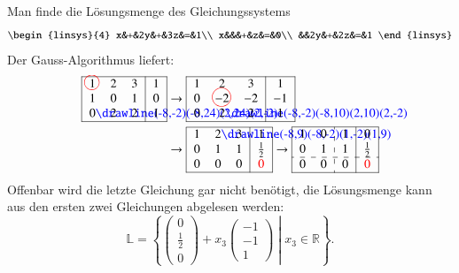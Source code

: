 \begin{beispiel}
Man finde die Lösungsmenge des Gleichungssystems
\[
\begin{linsys}{4}
x&+&2y&+&3z&=&1\\
x&&&+&z&=&0\\
 &&2y&+&2z&=&1
\end{linsys}
\]
Der Gauss-Algorithmus liefert:
\begin{align*}
\begin{tabular}{|>{$}c<{$}>{$}c<{$}>{$}c<{$}|>{$}c<{$}|}
\hline
1%
\begin{picture}(0,0)
\color{red}\put(-3,4){\circle{12}}
\end{picture}%
&2&3&1\\
1&0&1&0\\
0%
\begin{picture}(0,0)
\color{blue}\drawline(-8,-2)(-8,24)(2,24)(2,-2)
\end{picture}%
&2&2&1\\
\hline
\end{tabular}
&\rightarrow
\begin{tabular}{|>{$}c<{$}>{$}c<{$}>{$}c<{$}|>{$}c<{$}|}
\hline
1&2&3&1\\
0&-2%
\begin{picture}(0,0)
\color{red}\put(-6,4){\circle{15}}
\end{picture}%
&-2&-1\\
0&2%
\begin{picture}(0,0)
\color{blue}\drawline(-8,-2)(-8,10)(2,10)(2,-2)
\end{picture}%
&2&1\\
\hline
\end{tabular}
\\
&\rightarrow
\begin{tabular}{|>{$}c<{$}>{$}c<{$}>{$}c<{$}|>{$}c<{$}|}
\hline
1&2%
\begin{picture}(0,0)
\color{blue}\drawline(-8,9)(-8,-2)(1,-2)(1,9)
\end{picture}%
&3&1\\
0&1&1&\frac12\\
0&0&0&\color{red}0\\
\hline
\end{tabular}
\rightarrow
\begin{tabular}{|>{$}c<{$}>{$}c<{$}:>{$}c<{$}|>{$}c<{$}|}
\hline
1&0&1&0\\
0&1&1&\frac12\\
\hdashline
0&0&0&\color{red}0\\
\hline
\end{tabular}
\end{align*}
Offenbar wird die letzte Gleichung gar nicht benötigt, die
Lösungsmenge kann aus den ersten zwei Gleichungen
abgelesen werden:
\[
\mathbb L=
\left\{
\left.
\begin{pmatrix}
0\\\frac12\\0
\end{pmatrix}
+x_3\begin{pmatrix}
-1\\-1\\1
\end{pmatrix}
\;
\right|\;
x_3\in\mathbb R
\right\}.
\]
\end{beispiel}

